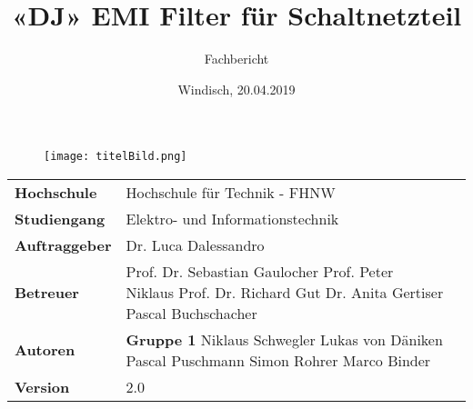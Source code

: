 \documentclass[final]{fhnwreport}       %
\title{«DJ» EMI Filter für Schaltnetzteil}          			%
\author{Fachbericht}  		%
\date{Windisch, 20.04.2019}             		%
\begin{document}
\maketitle

\vspace*{-1cm}						    %
\vfill
\begin{figure}[H]
\centering
\texttt{[image: titelBild.png]}
\end{figure}
\vfill

{
\renewcommand\arraystretch{2}
\begin{center}
\begin{tabular}{ >{\bf} l p{10cm} l }
Hochschule&Hochschule für Technik - FHNW\\
Studiengang&Elektro- und Informationstechnik\\
Auftraggeber&Dr. Luca Dalessandro\\
Betreuer&Prof. Dr. Sebastian Gaulocher \newline Prof. Peter Niklaus \newline Prof. Dr. Richard Gut \newline  Dr. Anita Gertiser \newline Pascal Buchschacher \\
Autoren&\textbf{Gruppe 1} \newline Niklaus Schwegler \newline Lukas von Däniken \newline Pascal Puschmann  \newline Simon Rohrer \newline Marco Binder\\
Version&2.0 %
\end{tabular}
\end{center}
}

\clearpage

			
\end{document}
